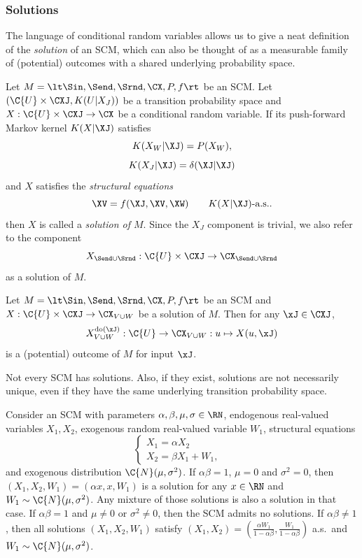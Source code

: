 \subsubsection{Solutions}

The language of conditional random variables allows us to give a neat definition of the \emph{solution} of an SCM, which can also be thought of as a measurable family of (potential) outcomes with a shared underlying probability space.

\begin{Def}\label{def:scm_solutions}
  Let $M = \lt \Sin, \Send, \Srnd, \CX, P, f \rt$ be an SCM.
  Let $(\C{U} \times \CXJ, K(U|X_J))$ be a transition probability space and $X : \C{U} \times \CXJ \to \CX$ be a conditional random variable.
  If its push-forward Markov kernel $K(X | \XJ)$ satisfies
  $$K(X_W | \XJ) = P(X_W),$$
  $$K(X_J | \XJ) = \delta(\XJ|\XJ)$$
  and $X$ satisfies the \emph{structural equations}
    \begin{equation}\label{eq:scm_structural_equations}
      \XV = f(\XJ, \XV, \XW) \qquad \text{$K(X|\XJ)$-a.s.}.
    \end{equation}
  then $X$ is called a \emph{solution of $M$}.
  Since the $X_J$ component is trivial, we also refer to the component 
  $$X_{\Send\cup \Srnd} : \C{U} \times \CXJ \to \CX_{\Send \cup \Srnd}$$
  as a solution of $M$.
\end{Def}
\begin{Rem}\label{def:scm_potential_outcome}
  Let $M = \lt \Sin, \Send, \Srnd, \CX, P, f \rt$ be an SCM and $X : \C{U} \times \CXJ \to \CX_{V\cup W}$ be a solution of $M$. 
  Then for any $\xJ \in \CXJ$, 
  $$X^{\doit(\xJ)}_{V\cup W} : \C{U} \to \CX_{V\cup W} : u \mapsto X(u,\xJ)$$ 
  is a (potential) outcome of $M$ for input $\xJ$.
\end{Rem}
Not every SCM has solutions. Also, if they exist,
solutions  are not necessarily unique, even if they have the same underlying transition probability space.
\begin{Eg}\label{eg:not_every_scm_has_solutions}
Consider an SCM with parameters $\alpha,\beta,\mu,\sigma \in \RN$, endogenous real-valued variables $X_1,X_2$, exogenous random real-valued variable $W_1$, structural equations
$$\begin{cases}
  X_1 = \alpha X_2 & \\
  X_2 = \beta X_1 + W_1, &
\end{cases}$$
and exogenous distribution $\C{N}(\mu,\sigma^2)$.
If $\alpha \beta = 1$, $\mu = 0$ and $\sigma^2=0$, then $(X_1,X_2,W_1) = (\alpha x,x,W_1)$ is a solution for any $x\in\RN$ and $W_1 \sim \C{N}(\mu,\sigma^2)$.
Any mixture of those solutions is also a solution in that case.
If $\alpha \beta = 1$ and $\mu \ne 0$ or $\sigma^2\ne 0$, then the SCM admits no solutions. 
If $\alpha \beta \ne 1$, then all solutions $(X_1,X_2,W_1)$ satisfy $(X_1,X_2) = (\frac{\alpha W_1}{1 - \alpha\beta},\frac{W_1}{1 - \alpha\beta})$ a.s.\ and $W_1 \sim \C{N}(\mu,\sigma^2)$.
\end{Eg}


